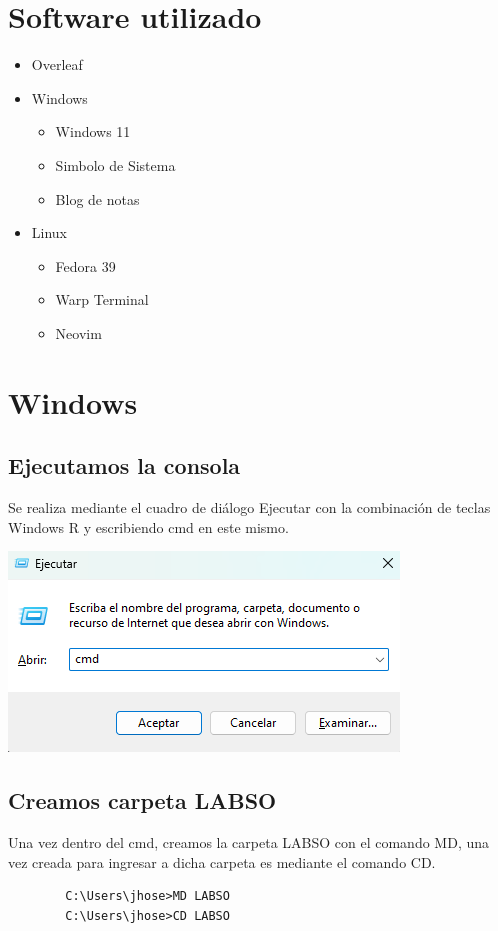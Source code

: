 \documentclass{article}
\begin{document}
\section{Software utilizado}
\begin{itemize}
    \item Overleaf
    \item Windows
        \begin{itemize}
            \item Windows 11
            \item Simbolo de Sistema
            \item Blog de notas
        \end{itemize}
    \item Linux
        \begin{itemize}
            \item Fedora 39
            \item Warp Terminal
            \item Neovim
        \end{itemize}
\end{itemize}

\newpage

\section{Windows}
    \subsection{Ejecutamos la consola}
        Se realiza mediante el cuadro de diálogo Ejecutar con la combinación de teclas Windows R y escribiendo cmd en este mismo.
    
    \includegraphics[scale=1.5]{WindowsCapturas/CuadroCMD.png}

    \subsection{Creamos carpeta LABSO}
        Una vez dentro del cmd, creamos la carpeta LABSO con el comando MD, una vez creada para ingresar a dicha carpeta es mediante el comando CD.
        \begin{verbatim}
        C:\Users\jhose>MD LABSO
        C:\Users\jhose>CD LABSO
        \end{verbatim}
        
\end{document}
